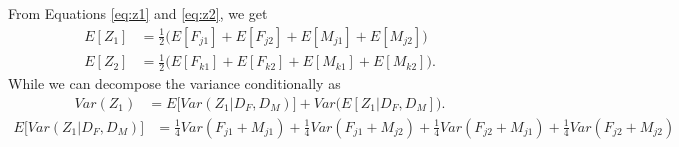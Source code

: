 \documentclass{article}
\begin{document}
From Equations \ref{eq:z1} and \ref{eq:z2}, we get
\begin{align}
  E[Z_1] & =  \frac{1}{2} \Big ( E[F_{j1}] + E[F_{j2}] + E[M_{j1}] + E[M_{j2}] \Big ) \label{eq:Expz1} \\
  E[Z_2] & =  \frac{1}{2} \Big ( E[F_{k1}] + E[F_{k2}] + E[M_{k1}] + E[M_{k2}] \Big ). \label{eq:Expz2}
\end{align}
While we can decompose the variance conditionally as
\begin{align*}
  Var(Z_1) & = E \Big [ Var(Z_1 | D_F, D_M) \Big ] + Var \Big ( E [ Z_1 | D_F, D_M ] \Big ).
\end{align*}
\begin{align*}
  E \Big [ Var(Z_1 | D_F, D_M) \Big ] & = \frac{1}{4} Var(F_{j1} + M_{j1}) + \frac{1}{4} Var(F_{j1} + M_{j2}) + \frac{1}{4} Var(F_{j2} + M_{j1}) + \frac{1}{4} Var(F_{j2} + M_{j2})
\end{align*}


\renewcommand*{\bibname}{References} %

\end{document}
